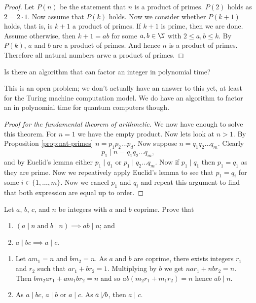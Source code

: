 \begin{proof}
	Let $P(n)$ be the statement that $n$ is a product of primes.
	$P(2)$ holds as $2 = 2 \cdot 1$.
	Now assume that $P(k)$ holds.
	Now we consider whether $P(k+1)$ holds, that is, 
	is $k + 1$ a product of primes.
	If $k + 1$ is prime, then we are done.
	Assume otherwise, then $k + 1 = ab$ for some $a, b \in \N$
	with $2 \leq a, b \leq k$.
	By $P(k)$, $a$ and $b$ are a product of primes.
	And hence $n$ is a product of primes.
	Therefore all natural numbers arwe a product of primes.
\end{proof}

\begin{problem}
	Is there an algorithm that can factor an integer in polynomial time?
\end{problem}

\begin{remark}
	This is an open problem; we don't actually have an answer to this yet,
	at least for the Turing machine computation model.
	We do have an algorithm to factor an in polynomial time for quantum computers
	though.
\end{remark}

\begin{proof}[Proof for the fundamental theorem of arithmetic]
	We now have enough to solve this theorem.
	For $n = 1$ we have the empty product.
	Now lets look at $n > 1$.
	By Proposition \ref{prop:nat-primes}
	$n = p_1 p_2 \ldots p_d$.
	Now suppose
	$n = q_1 q_2 \ldots q_m$.
	Clearly
	\[
		p_1 \mid n = q_1 q_2 \ldots q_m,
	\]
	and by Euclid's lemma either $p_1 \mid q_1$ or $p_1 \mid q_2 \ldots q_m$.
	Now if $p_1 \mid q_1$ then $p_1 = q_1$ as they are prime.
	Now we repeatively apply Euclid's lemma to see that $p_1 = q_i$ for some
	$i \in \{1, \ldots, m\}$.
	Now we cancel $p_1$ and $q_i$ and repeat this argument to find that
	both expression are equal up to order.
\end{proof}

\begin{problem}
	Let $a$, $b$, $c$, and $n$ be integers with $a$ and $b$ coprime.
	Prove that
	\begin{enumerate}
		\item $(a \mid n \;\text{and}\; b \mid n) \implies ab \mid n$; and
		\item $a \mid bc \implies a \mid c$.
	\end{enumerate}
\end{problem}

\begin{solution}
	\hfill
	\begin{enumerate}
		\item
			Let $am_1 = n$ and $bm_2 = n$.
			As $a$ and $b$ are coprime, there exists integers $r_1$ and $r_2$
			such that $ar_1 + br_2 = 1$.
			Multiplying by $b$ we get $nar_1 + nbr_2 = n$.
			Then $bm_2ar_1 + am_1br_2 = n$
			and so $ab(m_2r_1 + m_1r_2) = n$
			hence $ab \mid n$.

		\item
			As $a \mid bc$, $a \mid b$ or $a \mid c$.
			As $a \not\mid b$, then $a \mid c$.
	\end{enumerate}
\end{solution}



